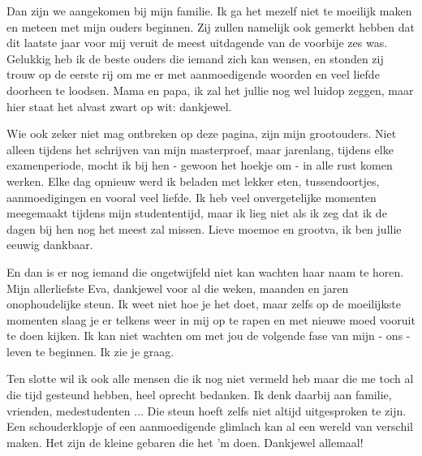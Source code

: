 Dan zijn we aangekomen bij mijn familie. Ik ga het mezelf niet te moeilijk maken en meteen met mijn ouders beginnen. Zij zullen namelijk ook gemerkt hebben dat dit laatste jaar voor mij veruit de meest uitdagende van de voorbije zes was. Gelukkig heb ik de beste ouders die iemand zich kan wensen, en stonden zij trouw op de eerste rij om me er met aanmoedigende woorden en veel liefde doorheen te loodsen. Mama en papa, ik zal het jullie nog wel luidop zeggen, maar hier staat het alvast zwart op wit: dankjewel.

Wie ook zeker niet mag ontbreken op deze pagina, zijn mijn grootouders. Niet alleen tijdens het schrijven van mijn masterproef, maar jarenlang, tijdens elke examenperiode, mocht ik bij hen - gewoon het hoekje om - in alle rust komen werken. Elke dag opnieuw werd ik beladen met lekker eten, tussendoortjes, aanmoedigingen en vooral veel liefde. Ik heb veel onvergetelijke momenten meegemaakt tijdens mijn studententijd, maar ik lieg niet als ik zeg dat ik de dagen bij hen nog het meest zal missen. Lieve moemoe en grootva, ik ben jullie eeuwig dankbaar.

En dan is er nog iemand die ongetwijfeld niet kan wachten haar naam te horen. Mijn allerliefste Eva, dankjewel voor al die weken, maanden en jaren onophoudelijke steun. Ik weet niet hoe je het doet, maar zelfs op de moeilijkste momenten slaag je er telkens weer in mij op te rapen en met nieuwe moed vooruit te doen kijken. Ik kan niet wachten om met jou de volgende fase van mijn - ons - leven te beginnen. Ik zie je graag.

Ten slotte wil ik ook alle mensen die ik nog niet vermeld heb maar die me toch al die tijd gesteund hebben, heel oprecht bedanken. Ik denk daarbij aan familie, vrienden, medestudenten ... Die steun hoeft zelfs niet altijd uitgesproken te zijn. Een schouderklopje of een aanmoedigende glimlach kan al een wereld van verschil maken. Het zijn de kleine gebaren die het 'm doen. Dankjewel allemaal!